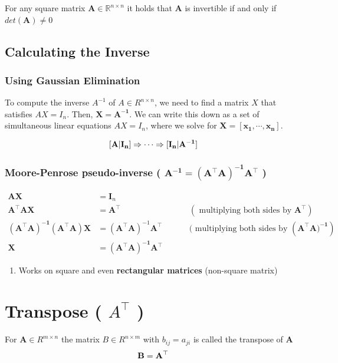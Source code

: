 \begin{theorem}
    For any square matrix $\mathbf{A} \in \mathbb{R}^{n\times n}$ it holds that $\mathbf{A}$ is invertible if and only if $det(\mathbf{A}) \neq 0$
\end{theorem}

\subsection{Calculating the Inverse \cite{mfml-1}}

\subsubsection{Using Gaussian Elimination}
To compute the inverse $A^{-1}$ of $A \in R^{n\times n}$, we need to find a matrix $X$ that satisfies $AX=I_n$. Then, $\mathbf{X = A^{-1}}$. We can write this down as a set of simultaneous linear equations $AX=I_n$, where we solve for $\mathbf{X = [x_1,\cdots,x_n]}$.

\[
    \displaystyle
    \hfill
    \mathbf{[A|I_n] \Rightarrow \cdots \Rightarrow [I_n|A^{-1}]}
    \hfill
\]

\subsubsection{Moore-Penrose pseudo-inverse ( $\mathbf{A^{-1} = (A^\top A)^{-1}A^\top }$ ) \cite{mfml-1}} \label{Moore-Penrose pseudo-inverse}

\begin{align*}
    \mathbf{AX} &= \mathbf{I}_n \\
    \mathbf{A^\top AX} &= \mathbf{A^\top} &&&& (\text{ multiplying both sides by } \mathbf{A^\top}) \\
    \mathbf{(A^\top A)^{-1}(A^\top A)X} &= (\mathbf{A^\top A})^{-1}\mathbf{A^\top} &&&& (\text{ multiplying both sides by } (\mathbf{A^\top A)^{-1}}) \\
    \mathbf{X} &= \mathbf{(A^\top A)^{-1}A^\top }
\end{align*}


\begin{enumerate}
    \item Works on square and even \textbf{rectangular matrices} (non-square matrix)
\end{enumerate}


\section{Transpose ( $A^\top$ ) \cite{mfml-1}}\label{matrix: Transpose}
For $\mathbf{A} \in R^{m\times n}$ the matrix $B \in R^{n\times m}$ with $b_{ij} = a_{ji}$ is called the transpose of $\mathbf{A}$
\[
    \hfill
    \mathbf{B = A}^\top
    \hfill
\]


